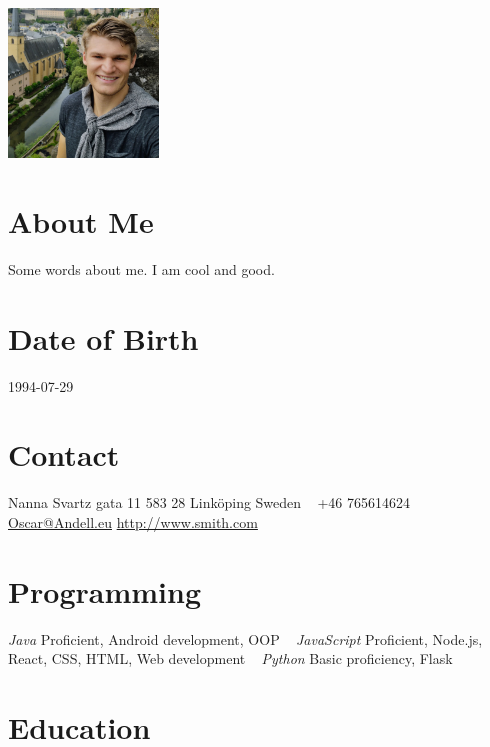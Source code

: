 \documentclass[]{k-cv} %
\begin{document}


\begin{aside} %
\includegraphics[width=4cm, height=4cm]{oscar2.jpg}
\section{About Me}
\color{gray}Some words about me. I am cool and good.
\section{Date of Birth}
\color{gray}1994-07-29
\section{Contact}
Nanna Svartz gata 11
583 28 Linköping
Sweden
~
+46 765614624
~
\href{mailto:john@smith.com}{Oscar@Andell.eu}
\href{http://www.smith.com}{http://www.smith.com}
\section{Programming}
\color{black}\textit{Java}
\color{gray}Proficient, Android development, OOP
~
\color{black}\textit{JavaScript}
\color{gray}Proficient, Node.js, React, CSS, HTML, Web development
~
\color{black}\textit{Python}
\color{gray}Basic proficiency, Flask
\end{aside}


\section{Education}
\end{document}
